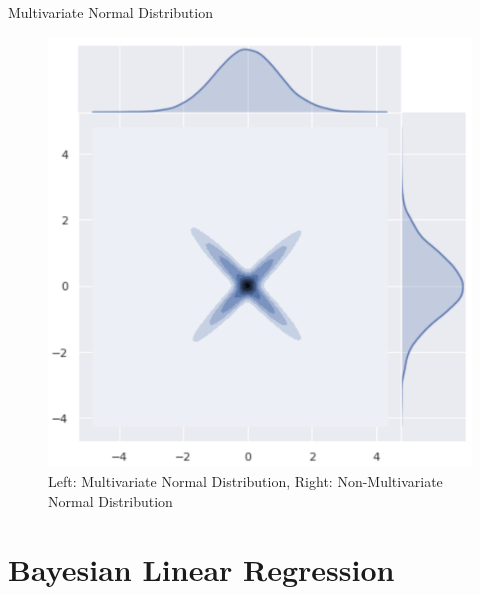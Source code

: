 \documentclass[10pt]{beamer}
\begin{document}
\begin{frame}{Multivariate Normal Distribution}{\cite{multivariate_normal_orduz_2019}}
\begin{center}
\begin{figure}
\includegraphics[scale=0.15]{images/no_multinormal_density.png} 
\caption{Left: Multivariate Normal Distribution, Right: Non-Multivariate Normal Distribution}
\end{figure}
\end{center}
\end{frame}


\section{Bayesian Linear Regression}
\end{document}
